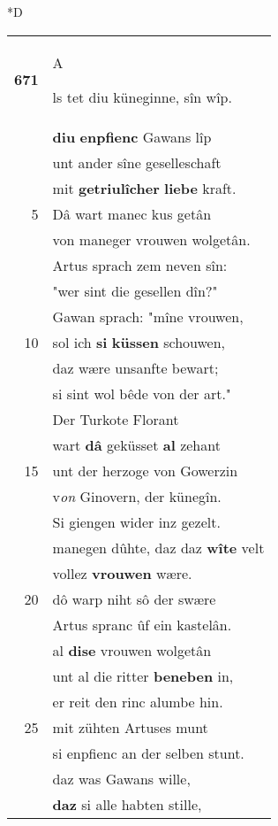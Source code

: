 \documentclass[8pt,a4paper,notitlepage]{article}
\begin{document}
\begin{table}[ht]
\begin{minipage}[t]{0.5\linewidth}
\small
\begin{center}*D
\end{center}
\begin{tabular}{rl}
\textbf{671} & \begin{large}A\end{large}ls tet diu küneginne, sîn wîp.\\ 
 & \textbf{diu} \textbf{enpfienc} Gawans lîp\\ 
 & unt ander sîne geselleschaft\\ 
 & mit \textbf{getriulîcher} \textbf{liebe} kraft.\\ 
5 & Dâ wart manec kus getân\\ 
 & von maneger vrouwen wolgetân.\\ 
 & Artus sprach zem neven sîn:\\ 
 & "wer sint die gesellen dîn?"\\ 
 & Gawan sprach: "mîne vrouwen,\\ 
10 & sol ich \textbf{si} \textbf{küssen} schouwen,\\ 
 & daz wære unsanfte bewart;\\ 
 & si sint wol bêde von der art."\\ 
 & Der Turkote Florant\\ 
 & wart \textbf{dâ} geküsset \textbf{al} zehant\\ 
15 & unt der herzoge von Gowerzin\\ 
 & v\textit{on} Ginovern, der künegîn.\\ 
 & Si giengen wider inz gezelt.\\ 
 & manegen dûhte, daz daz \textbf{wîte} velt\\ 
 & vollez \textbf{vrouwen} wære.\\ 
20 & dô warp niht sô der swære\\ 
 & Artus spranc ûf ein kastelân.\\ 
 & al \textbf{dise} vrouwen wolgetân\\ 
 & unt al die ritter \textbf{beneben} in,\\ 
 & er reit den rinc alumbe hin.\\ 
25 & mit zühten Artuses munt\\ 
 & si enpfienc an der selben stunt.\\ 
 & daz was Gawans wille,\\ 
 & \textbf{daz} si alle habten stille,\\ 

\end{tabular}
\end{minipage}
\end{table}
\end{document}
